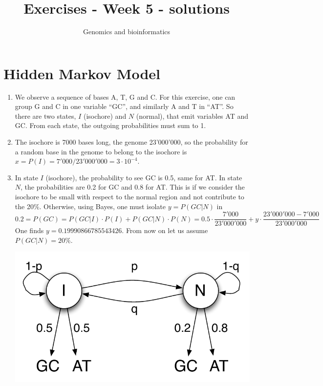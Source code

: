 \documentclass[a4paper,11pt]{article}
\title{Exercises - Week 5 - solutions}
\date{}
\author{Genomics and bioinformatics}
\begin{document}
\maketitle

\section{Hidden Markov Model}
\begin{enumerate}
\item We observe a sequence of bases A, T, G and C. For this exercise, one can group G and C in one variable ``GC'', and similarly A and T in ``AT''. So there are two states, $I$ (isochore) and $N$ (normal), that emit variables AT and GC. From each state, the outgoing probabilities must sum to 1.

\item The isochore is 7000 bases long, the genome 23'000'000, so the probability for a random base in the genome to belong to the isochore is $x = P(I) = 7'000/23'000'000 = 3\cdot 10^{-4}$.

\item In state $I$ (isochore), the probability to see GC is 0.5, same for AT. In state $N$, the probabilities are 0.2 for GC and 0.8 for AT. This is if we consider the isochore to be small with respect to the normal region and not contribute to the 20\%. Otherwise, using Bayes, one must isolate $y=P(GC | N)$ in
$$
0.2 = P(GC) = P(GC | I)\cdot P(I) + P(GC | N)\cdot P(N) = 0.5\cdot \frac{7'000}{23'000'000} + y\cdot \frac{23'000'000-7'000}{23'000'000}
$$
One finds $y=0.19990866785543426$. From now on let us assume $P(GC | N) = 20\%$.

\begin{center}
\includegraphics[height=0.2\textwidth]{hmm.pdf}
\end{center}


\end{enumerate}
\end{document}
